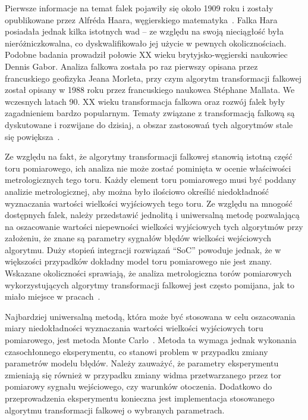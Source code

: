 Pierwsze informacje na temat falek pojawiły się około 1909 roku i zostały opublikowane przez Alfréda Haara, węgierskiego matematyka~\cite{haar_basics}. Falka Hara posiadała jednak kilka istotnych wad -- ze względu na swoją nieciągłość była nieróżniczkowalna, co dyskwalifikowało jej użycie w pewnych okolicznościach. Podobne badania prowadził połowie XX wieku brytyjsko-węgierski naukowiec Dennis Gabor. Analiza falkowa została po raz pierwszy opisana przez francuskiego geofizyka Jeana Morleta, przy czym algorytm transformacji falkowej został opisany w 1988 roku przez francuskiego naukowca Stéphane Mallata. We wczesnych latach 90. XX wieku transformacja falkowa oraz rozwój falek były zagadnieniem bardzo popularnym. Tematy związane z transformacją falkową są dyskutowane i rozwijane do dzisiaj, a obszar zastosowań tych algorytmów stale się powiększa~\cite{akujuobi_applications}.

Ze względu na fakt, że algorytmy transformacji falkowej stanowią istotną część toru pomiarowego, ich analiza nie może zostać pominięta w ocenie właściwości metrologicznych tego toru. Każdy element toru pomiarowego musi być poddany analizie metrologicznej, aby można było ilościowo określić niedokładność wyznaczania wartości wielkości wyjściowych tego toru. Ze względu na mnogość dostępnych falek, należy przedstawić jednolitą i uniwersalną metodę pozwalającą na oszacowanie wartości niepewności wielkości wyjściowych tych algorytmów przy założeniu, że znane są parametry sygnałów błędów wielkości wejściowych algorytmu. Duży stopień integracji rozwiązań \enquote{SoC} powoduje jednak, że w większości przypadków dokładny model toru pomiarowego nie jest znany. Wskazane okoliczności sprawiają, że analiza metrologiczna torów pomiarowych wykorzystujących algorytmy transformacji falkowej jest często pomijana, jak to miało miejsce w pracach~\cite{wallen_handbook, anping_seismic, yan_mechanics, niedopytalski_ene, niedopytalski_zwar, xie_metals}.

Najbardziej uniwersalną metodą, która może być stosowana w celu oszacowania miary niedokładności wyznaczania wartości wielkości wyjściowych toru pomiarowego, jest metoda Monte Carlo~\cite{jcgm_montecarlo, janssen_montecarlo, roj_annuncertainty}. Metoda ta wymaga jednak wykonania czasochłonnego eksperymentu, co stanowi problem w przypadku zmiany parametrów modelu błędów. Należy zauważyć, że parametry eksperymentu zmieniają się również w przypadku zmiany widma przetwarzanego przez tor pomiarowy sygnału wejściowego, czy warunków otoczenia. Dodatkowo do przeprowadzenia eksperymentu konieczna jest implementacja stosowanego algorytmu transformacji falkowej o wybranych parametrach.

